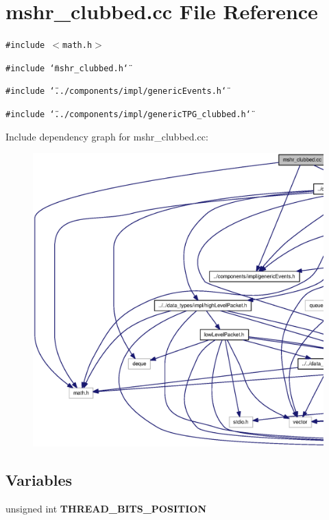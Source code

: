 \section{mshr\_\-clubbed.cc File Reference}
\label{mshr__clubbed_8cc}
{\tt \#include $<$math.h$>$}\par
{\tt \#include \char`\"{}mshr\_\-clubbed.h\char`\"{}}\par
{\tt \#include \char`\"{}../components/impl/genericEvents.h\char`\"{}}\par
{\tt \#include \char`\"{}../components/impl/genericTPG\_\-clubbed.h\char`\"{}}\par


Include dependency graph for mshr\_\-clubbed.cc:\nopagebreak
\begin{figure}[H]
\begin{center}
\leavevmode
\includegraphics[width=420pt]{mshr__clubbed_8cc__incl}
\end{center}
\end{figure}
\subsection*{Variables}
\begin{CompactItemize}
\item 
unsigned int {\bf THREAD\_\-BITS\_\-POSITION}
\end{CompactItemize}


